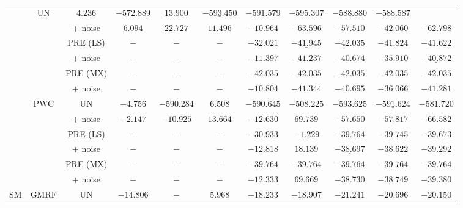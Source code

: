 \begin{table}[!t]
\begin{minipage}{1\textwidth}
\begin{tabular}{ccccccccccc}
                    & UN
                    & $4.236$ & $-572.889$ & $13.900$ & $\underline{-593.450}$ & $-591.579$ & $\mathbf{-595.307}$ & $-588.880$ & $-588.587$  \\
                    && + noise
                    & $6.094$ & $22.727$ & $11.496$ & $-10.964$ & $\mathbf{-63.596}$ & $-57.510$ & $-42.060$ & $\underline{-62.798}$  \\ 
                    && PRE (LS)
                    & $-$ & $-$ & $-$ & $-32.021$ & $\underline{-41.945}$ & $\mathbf{-42.035}$ & $-41.824$ & $-41.622$  \\
                    && + noise
                    & $-$ & $-$ & $-$ & $-11.397$ & $\mathbf{-41.237}$ & $-40.674$ & $-35.910$ & $\underline{-40.872}$  \\ 
                    && PRE (MX)
                    & $-$ & $-$ & $-$ & $-42.035$ & $-42.035$ & $-42.035$ & $-42.035$ & $-42.035$  \\
                    && + noise
                    & $-$ & $-$ & $-$ & $-10.804$ & $\mathbf{-41.344}$ & $-40.695$ & $-36.066$ & $\underline{-41.281}$  \\ 
                \cmidrule(lr){2-11}
                & \multirow{6}{*}{PWC}
                    & UN
                    & $-4.756$ & $-590.284$ & $6.508$ & $-590.645$ & $-508.225$ & $\mathbf{-593.625}$ & $\underline{-591.624}$ & $-581.720$  \\
                    && + noise
                    & $-2.147$ & $-10.925$ & $13.664$ & $-12.630$ & $69.739$ & $-57.650$ & $\underline{-57.817}$ & $\mathbf{-66.582}$  \\ 
                    && PRE (LS)
                    & $-$ & $-$ & $-$ & $-30.933$ & $-1.229$ & $\mathbf{-39.764}$ & $\underline{-39.745}$ & $-39.673$  \\
                    && + noise
                    & $-$ & $-$ & $-$ & $-12.818$ & $18.139$ & $\underline{-38.697}$ & $-38.622$ & $\mathbf{-39.292}$  \\ 
                    && PRE (MX)
                    & $-$ & $-$ & $-$ & $-39.764$ & $-39.764$ & $-39.764$ & $-39.764$ & $-39.764$  \\
                    && + noise
                    & $-$ & $-$ & $-$ & $-12.333$ & $69.669$ & $-38.730$ & $\underline{-38.749}$ & $\mathbf{-39.380}$  \\  
        \midrule
            \multirow{12}{*}{SM}
                & \multirow{6}{*}{GMRF}
                    & UN
                    & $-14.806$  & $-$ & $5.968$ & $-18.233$ & $-18.907$ & $\mathbf{-21.241}$ & $\underline{-20.696}$ & $-20.150$  \\

\end{tabular}
\end{minipage}
\end{table}
